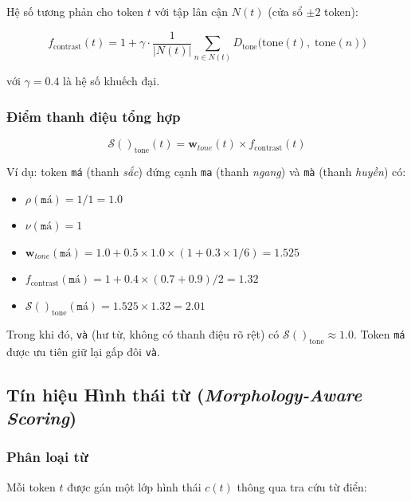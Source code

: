 \documentclass[12pt,a4paper]{article}
\newcommand{\tone}[1]{\textit{#1}}          %
\newcommand{\score}[1]{\mathcal{S}(#1)}      %
\newcommand{\weight}[1]{\mathbf{w}_{#1}}     %
\newcommand{\token}[1]{\texttt{#1}}          %
\begin{document}
Hệ số tương phản cho token $t$ với tập lân cận $N(t)$ (cửa sổ $\pm 2$ token):

\begin{equation}\label{eq:contrast}
    f_{\text{contrast}}(t) = 1 + \gamma \cdot \frac{1}{|N(t)|} \sum_{n \in N(t)} D_{\text{tone}}\big(\text{tone}(t),\; \text{tone}(n)\big)
\end{equation}

với $\gamma = 0.4$ là hệ số khuếch đại.

\subsubsection{Điểm thanh điệu tổng hợp}

\begin{equation}\label{eq:tone_score}
    \score{}_{\text{tone}}(t) = \weight{tone}(t) \times f_{\text{contrast}}(t)
\end{equation}

Ví dụ: token \token{má} (thanh \tone{sắc}) đứng cạnh \token{ma} (thanh \tone{ngang}) và \token{mà} (thanh \tone{huyền}) có:
\begin{itemize}
    \item $\rho(\token{má}) = 1/1 = 1.0$
    \item $\nu(\token{má}) = 1$
    \item $\weight{tone}(\token{má}) = 1.0 + 0.5 \times 1.0 \times (1 + 0.3 \times 1/6) = 1.525$
    \item $f_{\text{contrast}}(\token{má}) = 1 + 0.4 \times (0.7 + 0.9)/2 = 1.32$
    \item $\score{}_{\text{tone}}(\token{má}) = 1.525 \times 1.32 = 2.01$
\end{itemize}

Trong khi đó, \token{và} (hư từ, không có thanh điệu rõ rệt) có $\score{}_{\text{tone}} \approx 1.0$. Token \token{má} được ưu tiên giữ lại gấp đôi \token{và}.

\subsection{Tín hiệu Hình thái từ (\textit{Morphology-Aware Scoring})}

\subsubsection{Phân loại từ}

Mỗi token $t$ được gán một lớp hình thái $c(t)$ thông qua tra cứu từ điển:
\end{document}
